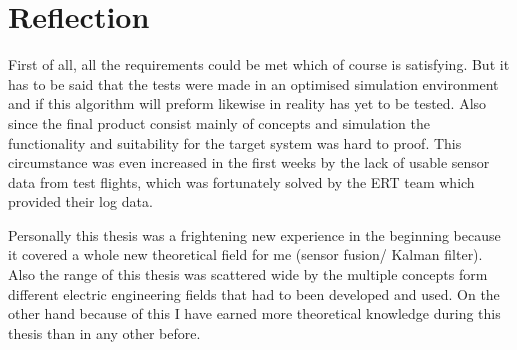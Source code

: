 \section{Reflection}
First of all, all the requirements could be met which of course is satisfying. 
But it has to be said that the tests were made in an optimised simulation environment and if this algorithm will preform likewise in reality has yet to be tested.
Also since the final product consist mainly of concepts and simulation the functionality and suitability for the target system was hard to proof.
This circumstance was even increased in the first weeks by the lack of usable sensor data from test flights,
which was fortunately solved by the ERT team which provided their log data.

Personally this thesis was a frightening new experience in the beginning because it covered a whole new theoretical field for me (sensor fusion/ Kalman filter).
Also the range of this thesis was scattered wide by the multiple concepts form different electric engineering fields that had to been developed and used.
On the other hand because of this I have earned more theoretical knowledge during this thesis than in any other before.
